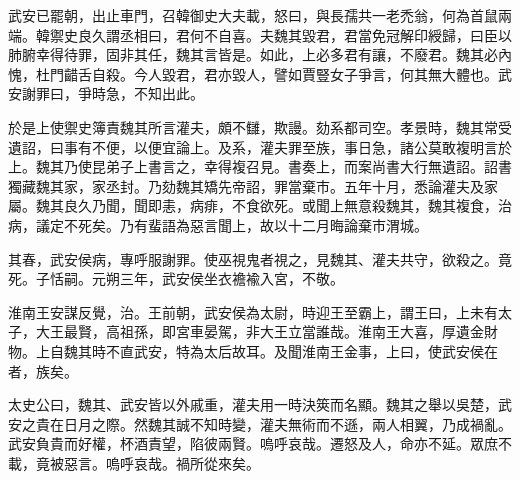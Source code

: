 武安已罷朝，出止車門，召韓御史大夫載，怒曰，與長孺共一老禿翁，何為首鼠兩端。韓禦史良久謂丞相曰，君何不自喜。夫魏其毀君，君當免冠解印綬歸，曰臣以肺腑幸得待罪，固非其任，魏其言皆是。如此，上必多君有讓，不廢君。魏其必內愧，杜門齰舌自殺。今人毀君，君亦毀人，譬如賈豎女子爭言，何其無大體也。武安謝罪曰，爭時急，不知出此。

於是上使禦史簿責魏其所言灌夫，頗不讎，欺謾。劾系都司空。孝景時，魏其常受遺詔，曰事有不便，以便宜論上。及系，灌夫罪至族，事日急，諸公莫敢複明言於上。魏其乃使昆弟子上書言之，幸得複召見。書奏上，而案尚書大行無遺詔。詔書獨藏魏其家，家丞封。乃劾魏其矯先帝詔，罪當棄市。五年十月，悉論灌夫及家屬。魏其良久乃聞，聞即恚，病痱，不食欲死。或聞上無意殺魏其，魏其複食，治病，議定不死矣。乃有蜚語為惡言聞上，故以十二月晦論棄市渭城。

其春，武安侯病，專呼服謝罪。使巫視鬼者視之，見魏其、灌夫共守，欲殺之。竟死。子恬嗣。元朔三年，武安侯坐衣襜褕入宮，不敬。

淮南王安謀反覺，治。王前朝，武安侯為太尉，時迎王至霸上，謂王曰，上未有太子，大王最賢，高祖孫，即宮車晏駕，非大王立當誰哉。淮南王大喜，厚遺金財物。上自魏其時不直武安，特為太后故耳。及聞淮南王金事，上曰，使武安侯在者，族矣。

太史公曰，魏其、武安皆以外戚重，灌夫用一時決筴而名顯。魏其之舉以吳楚，武安之貴在日月之際。然魏其誠不知時變，灌夫無術而不遜，兩人相翼，乃成禍亂。武安負貴而好權，杯酒責望，陷彼兩賢。嗚呼哀哉。遷怒及人，命亦不延。眾庶不載，竟被惡言。嗚呼哀哉。禍所從來矣。